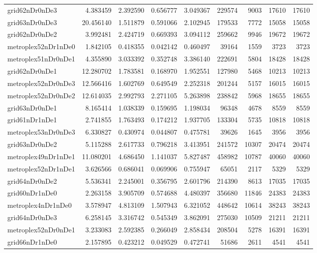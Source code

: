 \begin{longtable}{|l|r|r|r|r|r|r|r|r|}
grid62nDr0nDe3 & 4.383459 & 2.392590 & 0.656777 & 3.049367 & 229574 & 9003 & 17610 & 17610 \\
grid63nDr0nDe3 & 20.456140 & 1.511879 & 0.591066 & 2.102945 & 179533 & 7772 & 15058 & 15058 \\
grid62nDr0nDe2 & 3.992481 & 2.424719 & 0.669393 & 3.094112 & 259662 & 9946 & 19672 & 19672 \\
metroplex52nDr1nDe0 & 1.842105 & 0.418355 & 0.042142 & 0.460497 & 39164 & 1559 & 3723 & 3723 \\
metroplex51nDr0nDe1 & 4.355890 & 3.033392 & 0.352748 & 3.386140 & 222691 & 5804 & 18428 & 18428 \\
grid62nDr0nDe1 & 12.280702 & 1.783581 & 0.168970 & 1.952551 & 127980 & 5468 & 10213 & 10213 \\
metroplex52nDr0nDe3 & 12.566416 & 1.602769 & 0.649549 & 2.252318 & 201244 & 5157 & 16015 & 16015 \\
metroplex52nDr0nDe2 & 12.614035 & 2.992793 & 2.271105 & 5.263898 & 238842 & 5968 & 18655 & 18655 \\
grid63nDr0nDe1 & 8.165414 & 1.038339 & 0.159695 & 1.198034 & 96348 & 4678 & 8559 & 8559 \\
grid61nDr1nDe1 & 2.741855 & 1.763493 & 0.174212 & 1.937705 & 133304 & 5735 & 10818 & 10818 \\
metroplex53nDr0nDe3 & 6.330827 & 0.430974 & 0.044807 & 0.475781 & 39626 & 1645 & 3956 & 3956 \\
grid63nDr0nDe2 & 5.115288 & 2.617733 & 0.796218 & 3.413951 & 241572 & 10307 & 20474 & 20474 \\
metroplex49nDr1nDe1 & 11.080201 & 4.686450 & 1.141037 & 5.827487 & 458982 & 10787 & 40060 & 40060 \\
metroplex52nDr1nDe1 & 3.626566 & 0.686041 & 0.069906 & 0.755947 & 65051 & 2117 & 5329 & 5329 \\
grid64nDr0nDe2 & 5.536341 & 2.245001 & 0.356795 & 2.601796 & 214390 & 8613 & 17035 & 17035 \\
grid60nDr1nDe0 & 2.263158 & 3.905709 & 0.574688 & 4.480397 & 356680 & 11846 & 24383 & 24383 \\
metroplex4nDr1nDe0 & 3.578947 & 4.813109 & 1.507943 & 6.321052 & 448642 & 10614 & 38243 & 38243 \\
grid64nDr0nDe3 & 6.258145 & 3.316742 & 0.545349 & 3.862091 & 275030 & 10509 & 21211 & 21211 \\
metroplex52nDr0nDe1 & 3.233083 & 2.592385 & 0.266049 & 2.858434 & 208504 & 5278 & 16391 & 16391 \\
grid66nDr1nDe0 & 2.157895 & 0.423212 & 0.049529 & 0.472741 & 51686 & 2611 & 4541 & 4541 \\

\end{longtable}
